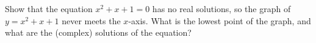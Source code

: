 Show that the equation $x^2+x+1=0$ has no real solutions, so the graph of $y=x^2+x+1$ never meets the $x$-axis. What is the lowest point of the graph, and what are the (complex) solutions of the equation?
